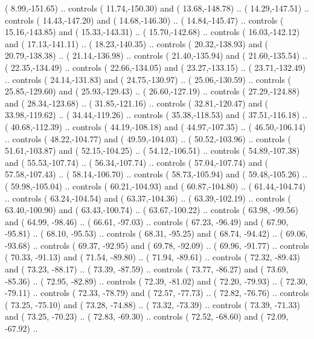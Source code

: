 {        (   8.99,-151.65) .. controls (  11.74,-150.30) and (  13.68,-148.78) ..
        (  14.29,-147.51) .. controls (  14.43,-147.20) and (  14.68,-146.30) ..
        (  14.84,-145.47) .. controls (  15.16,-143.85) and (  15.33,-143.31) ..
        (  15.70,-142.68) .. controls (  16.03,-142.12) and (  17.13,-141.11) ..
        (  18.23,-140.35) .. controls (  20.32,-138.93) and (  20.79,-138.38) ..
        (  21.14,-136.98) .. controls (  21.40,-135.94) and (  21.60,-135.54) ..
        (  22.35,-134.49) .. controls (  22.66,-134.05) and (  23.27,-133.15) ..
        (  23.71,-132.49) .. controls (  24.14,-131.83) and (  24.75,-130.97) ..
        (  25.06,-130.59) .. controls (  25.85,-129.60) and (  25.93,-129.43) ..
        (  26.60,-127.19) .. controls (  27.29,-124.88) and (  28.34,-123.68) ..
        (  31.85,-121.16) .. controls (  32.81,-120.47) and (  33.98,-119.62) ..
        (  34.44,-119.26) .. controls (  35.38,-118.53) and (  37.51,-116.18) ..
        (  40.68,-112.39) .. controls (  44.19,-108.18) and (  44.97,-107.35) ..
        (  46.50,-106.14) .. controls (  48.22,-104.77) and (  49.59,-104.03) ..
        (  50.52,-103.96) .. controls (  51.61,-103.87) and (  52.15,-104.25) ..
        (  54.12,-106.51) .. controls (  54.89,-107.38) and (  55.53,-107.74) ..
        (  56.34,-107.74) .. controls (  57.04,-107.74) and (  57.58,-107.43) ..
        (  58.14,-106.70) .. controls (  58.73,-105.94) and (  59.48,-105.26) ..
        (  59.98,-105.04) .. controls (  60.21,-104.93) and (  60.87,-104.80) ..
        (  61.44,-104.74) .. controls (  63.24,-104.54) and (  63.37,-104.36) ..
        (  63.39,-102.19) .. controls (  63.40,-100.90) and (  63.43,-100.74) ..
        (  63.67,-100.22) .. controls (  63.98, -99.56) and (  64.99, -98.46) ..
        (  66.61, -97.03) .. controls (  67.23, -96.49) and (  67.90, -95.81) ..
        (  68.10, -95.53) .. controls (  68.31, -95.25) and (  68.74, -94.42) ..
        (  69.06, -93.68) .. controls (  69.37, -92.95) and (  69.78, -92.09) ..
        (  69.96, -91.77) .. controls (  70.33, -91.13) and (  71.54, -89.80) ..
        (  71.94, -89.61) .. controls (  72.32, -89.43) and (  73.23, -88.17) ..
        (  73.39, -87.59) .. controls (  73.77, -86.27) and (  73.69, -85.36) ..
        (  72.95, -82.89) .. controls (  72.39, -81.02) and (  72.20, -79.93) ..
        (  72.30, -79.11) .. controls (  72.33, -78.79) and (  72.57, -77.73) ..
        (  72.82, -76.76) .. controls (  73.25, -75.10) and (  73.28, -74.88) ..
        (  73.32, -73.39) .. controls (  73.39, -71.33) and (  73.25, -70.23) ..
        (  72.83, -69.30) .. controls (  72.52, -68.60) and (  72.09, -67.92) ..
}
